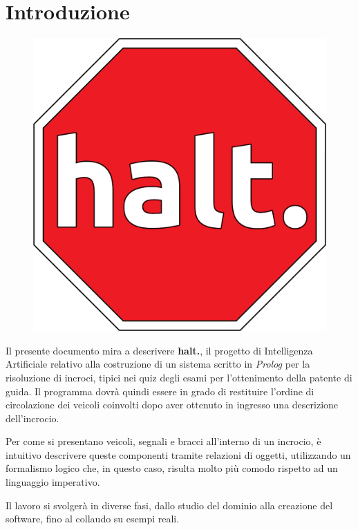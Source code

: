 \chapter{Introduzione}

\vspace{-4em}

\begin{figure}[!htb]
	\centering
	\includegraphics[scale=.15]{images/halt}
\end{figure}

Il presente documento mira a descrivere \textbf{halt.}, il progetto di Intelligenza Artificiale relativo alla costruzione di un sistema scritto in \emph{Prolog} per la risoluzione di incroci, tipici nei quiz degli esami per l'ottenimento della patente di guida. Il programma dovrà quindi essere in grado di restituire l'ordine di circolazione dei veicoli coinvolti dopo aver ottenuto in ingresso una descrizione dell'incrocio.

Per come si presentano veicoli, segnali e bracci all'interno di un incrocio, è intuitivo descrivere queste componenti tramite relazioni di oggetti, utilizzando un formalismo logico che, in questo caso, risulta molto più comodo rispetto ad un linguaggio imperativo. 

Il lavoro si svolgerà in diverse fasi, dallo studio del dominio alla creazione del software, fino al collaudo su esempi reali.
